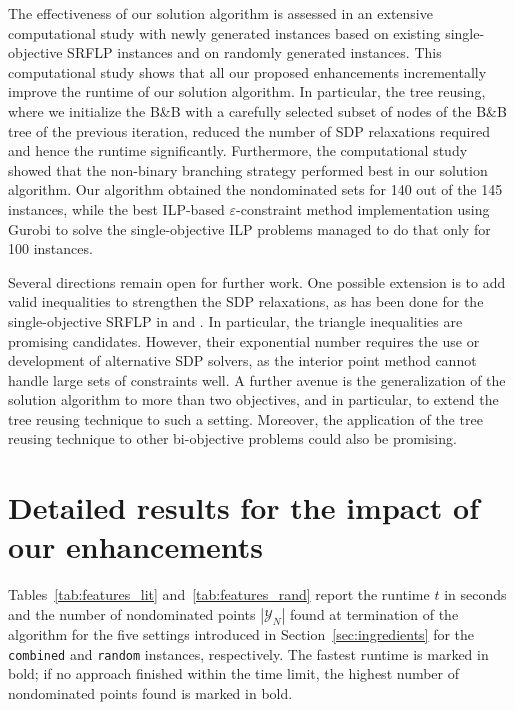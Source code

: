 \documentclass{article}
\newcommand{\BB}{B\&B\xspace}
\newcommand{\SRFLP}{SRFLP\xspace}
\begin{document}
The effectiveness of our solution algorithm is assessed in an extensive computational study with newly generated instances based on existing single-objective SRFLP instances and on randomly generated instances. 
This computational study shows that all our proposed enhancements incrementally improve the runtime of our solution algorithm. In particular, the tree reusing, where we initialize the \BB with a carefully selected subset of nodes of the \BB tree of the previous iteration, reduced the number of SDP relaxations required and hence the runtime significantly. Furthermore, the computational study showed that the non-binary branching strategy performed best in our solution algorithm. Our algorithm obtained the nondominated sets for 140 out of the 145 instances, while the best ILP-based $\varepsilon$-constraint method implementation using Gurobi to solve the single-objective ILP problems managed to do that only for 100 instances.

Several directions remain open for further work. One possible extension is to add valid inequalities to strengthen the SDP relaxations, as has been done for the single-objective \SRFLP in \citet{hungerlander_semidefinite_2013} and \citet{Schwiddessen2020}. In particular, the triangle inequalities are promising candidates. However, their exponential number requires the use or development of alternative SDP solvers, as the interior point method cannot handle large sets of constraints well. 
A further avenue is the generalization of the solution algorithm to more than two objectives, and in particular, to extend the tree reusing technique to such a setting. Moreover, the application of the tree reusing technique to other bi-objective problems could also be promising.


\ifArXiV

\else

\fi


\clearpage
\appendix

\section{Detailed results for the impact of our enhancements} \label{app:ingredients}
Tables~\ref{tab:features_lit} and~\ref{tab:features_rand} report the runtime $t$ in seconds and the number of nondominated points $|\mathcal{Y}_N|$ found at termination of the algorithm for the five settings introduced in Section~\ref{sec:ingredients} for the \texttt{combined} and \texttt{random} instances, respectively. The fastest runtime is marked in bold; if no approach finished within the time limit, the highest number of nondominated points found is marked in bold. 
\end{document}
